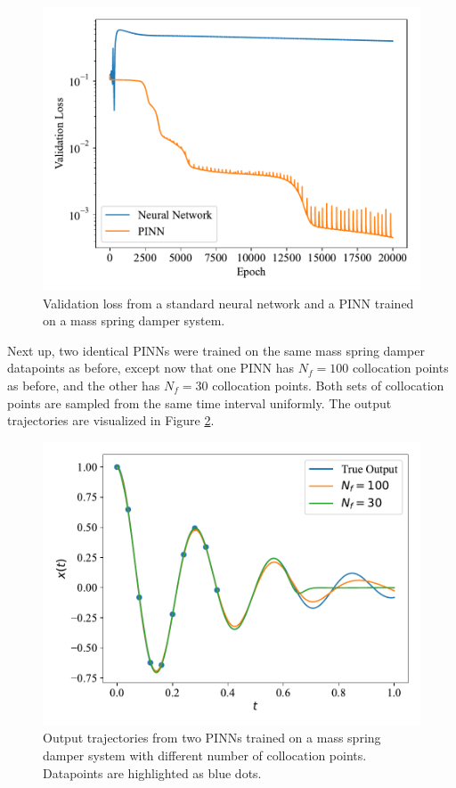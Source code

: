 \begin{figure}[H]
    \centering
    \includegraphics[width=1.0\linewidth]{Figures/InitialExperiments/msd_val_loss.pdf}
    \caption{Validation loss from a standard neural network and a PINN trained on a mass spring damper system.}
    \label{fig:msd_val_loss}
\end{figure}

Next up, two identical PINNs were trained on the same mass spring damper datapoints as before, except now that one PINN has $N_f = 100$ collocation points as before, and the other has $N_f = 30$ collocation points. Both sets of collocation points are sampled from the same time interval uniformly. The output trajectories are visualized in Figure \ref{fig:msd_pinns}.

\begin{figure}[H]
    \centering
    \includegraphics[width=1.0\linewidth]{Figures/InitialExperiments/msd_pinns.pdf}
    \caption{Output trajectories from two PINNs trained on a mass spring damper system with different number of collocation points. Datapoints are highlighted as blue dots.}
    \label{fig:msd_pinns}
\end{figure}

